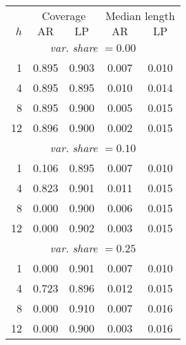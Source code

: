\begin{tabular}{r|cc|cc}
& \multicolumn{2}{c|}{Coverage} & \multicolumn{2}{c}{Median length} \\
$h$ & $\text{AR}$ & $\text{LP}$ & $\text{AR}$ & $\text{LP}$ \\
\hline
\multicolumn{5}{c}{\emph{var. share $= 0.00$}} \\
  1 & 0.895 & 0.903 & 0.007 & 0.010 \\
  4 & 0.895 & 0.895 & 0.010 & 0.014 \\
  8 & 0.895 & 0.900 & 0.005 & 0.015 \\
 12 & 0.896 & 0.900 & 0.002 & 0.015 \\
\multicolumn{5}{c}{\emph{var. share $= 0.10$}} \\
  1 & 0.106 & 0.895 & 0.007 & 0.010 \\
  4 & 0.823 & 0.901 & 0.011 & 0.015 \\
  8 & 0.000 & 0.900 & 0.006 & 0.015 \\
 12 & 0.000 & 0.902 & 0.003 & 0.015 \\
\multicolumn{5}{c}{\emph{var. share $= 0.25$}} \\
  1 & 0.000 & 0.901 & 0.007 & 0.010 \\
  4 & 0.723 & 0.896 & 0.012 & 0.015 \\
  8 & 0.000 & 0.910 & 0.007 & 0.016 \\
 12 & 0.000 & 0.900 & 0.003 & 0.016 \\
\end{tabular}